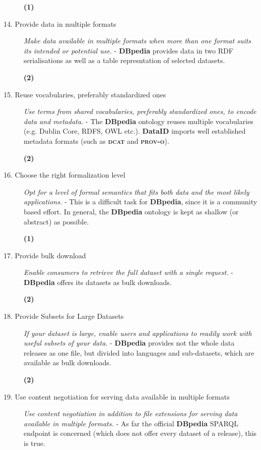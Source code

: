\documentclass[a4paper,english,twoside,BCOR1.5cm,headsepline,DIV12,appendixprefix,final,12pt]{scrbook}
\newcommand{\dataid}{{\ttfamily\bfseries DataID}\xspace}
\newcommand{\prov}{{\scshape\bfseries prov-o}\xspace}
\newcommand{\dcat}{{\scshape\bfseries dcat}\xspace}
\newcommand{\dbpedia}{{\ttfamily\bfseries DBpedia}\xspace}
\begin{document}
\begin{description}
\begin{flushright}\color{BurntOrange}\textbf{(1)}\end{flushright}
 \item[14. Provide data in multiple formats] \textit{Make data available in multiple formats when more than one format suits its intended or potential use.} - \dbpedia provides data in two RDF serialisations as well as a table represntation of selected datasets.
\begin{flushright}\color{ForestGreen}\textbf{(2)}\end{flushright}
 \item[15. Reuse vocabularies, preferably standardized ones] \textit{Use terms from shared vocabularies, preferably standardized ones, to encode data and metadata.} - The \dbpedia ontology reuses multiple vocabularies (e.g. Dublin Core, RDFS, OWL etc.). \dataid imports well established metadata formats (such as \dcat and \prov).
\begin{flushright}\color{ForestGreen}\textbf{(2)}\end{flushright}
 \item[16. Choose the right formalization level] \textit{Opt for a level of formal semantics that fits both data and the most likely applications.} - This is a difficult task for \dbpedia, since it is a community based effort. In general, the \dbpedia ontology is kept as shallow (or abstract) as possible.
\begin{flushright}\color{BurntOrange}\textbf{(1)}\end{flushright}
 \item[17. Provide bulk download] \textit{Enable consumers to retrieve the full dataset with a single request.} - \dbpedia offers its datasets as bulk downloads.
\begin{flushright}\color{ForestGreen}\textbf{(2)}\end{flushright}
 \item[18. Provide Subsets for Large Datasets] \textit{If your dataset is large, enable users and applications to readily work with useful subsets of your data.} - \dbpedia provides not the whole data releases as one file, but divided into languages and sub-datasets, which are available as bulk downloads.
\begin{flushright}\color{ForestGreen}\textbf{(2)}\end{flushright}
 \item[19. Use content negotiation for serving data available in multiple formats] \textit{Use content negotiation in addition to file extensions for serving data available in multiple formats.} - As far the official \dbpedia SPARQL endpoint is concerned (which does not offer every dataset of a release), this is true.

\end{description}
\end{document}
